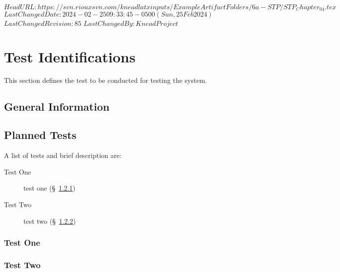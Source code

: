 \svnidlong
{$HeadURL: https://svn.riouxsvn.com/kneadlatxinputs/ExampleArtifactFolders/6a-STP/STP_Chapter_04.tex $}
{$LastChangedDate: 2024-02-25 09:33:45 -0500 (Sun, 25 Feb 2024) $}
{$LastChangedRevision: 85 $}
{$LastChangedBy: KneadProject $}


\chapter{Test Identifications}
\label{loc:TestIdentifications}


This section defines the test to be conducted for testing the system.

\section{General Information}
\label{loc:TestGeneralInformation}



\section{Planned Tests}
\label{loc:TestGeneralInformation}


A list of tests and brief description are:
\begin{description}
\item [Test One] test one (\S~\ref{loc:TestIdOne})
\item [Test Two] test two (\S~\ref{loc:TestIdTwo})
\end{description}

\subsection{Test One}
\label{loc:TestIdOne}
\newcommand{\TestIdName}{TIDone}%


\subsection{Test Two}
\label{loc:TestIdTwo}
\renewcommand{\TestIdName}{TIDtwo}%



